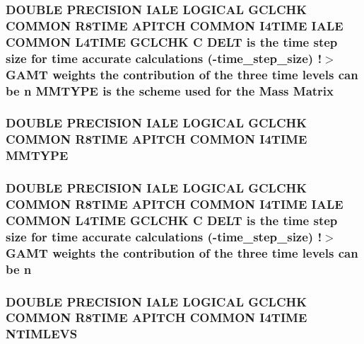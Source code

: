\hypertarget{time_8com_a04b69bf706ac5ad697f30180a0614468}{
\subsubsection[{Matrix}]{\setlength{\rightskip}{0pt plus 5cm}D\-O\-U\-B\-L\-E P\-R\-E\-C\-I\-S\-I\-O\-N I\-A\-L\-E L\-O\-G\-I\-C\-A\-L G\-C\-L\-C\-H\-K C\-O\-M\-M\-O\-N R8\-T\-I\-M\-E {\bf A\-P\-I\-T\-C\-H} C\-O\-M\-M\-O\-N I4\-T\-I\-M\-E I\-A\-L\-E C\-O\-M\-M\-O\-N L4\-T\-I\-M\-E G\-C\-L\-C\-H\-K C {\bf D\-E\-L\-T} is the time {\bf step} size for time accurate calculations (-\/time\-\_\-step\-\_\-size) !$>$ {\bf G\-A\-M\-T} weights the contribution of the three time levels can be {\bf n} {\bf M\-M\-T\-Y\-P\-E} is the scheme {\bf used} for the Mass Matrix}}\label{time_8com_a04b69bf706ac5ad697f30180a0614468}
\hypertarget{time_8com_a7cab4e82cd8529facf6a2802f81887ff}{
\subsubsection[{M\-M\-T\-Y\-P\-E}]{\setlength{\rightskip}{0pt plus 5cm}D\-O\-U\-B\-L\-E P\-R\-E\-C\-I\-S\-I\-O\-N I\-A\-L\-E L\-O\-G\-I\-C\-A\-L G\-C\-L\-C\-H\-K C\-O\-M\-M\-O\-N R8\-T\-I\-M\-E {\bf A\-P\-I\-T\-C\-H} C\-O\-M\-M\-O\-N I4\-T\-I\-M\-E M\-M\-T\-Y\-P\-E}}\label{time_8com_a7cab4e82cd8529facf6a2802f81887ff}
\hypertarget{time_8com_a59787df2891338b611ba3a1096154aa3}{
\subsubsection[{n}]{\setlength{\rightskip}{0pt plus 5cm}D\-O\-U\-B\-L\-E P\-R\-E\-C\-I\-S\-I\-O\-N I\-A\-L\-E L\-O\-G\-I\-C\-A\-L G\-C\-L\-C\-H\-K C\-O\-M\-M\-O\-N R8\-T\-I\-M\-E {\bf A\-P\-I\-T\-C\-H} C\-O\-M\-M\-O\-N I4\-T\-I\-M\-E I\-A\-L\-E C\-O\-M\-M\-O\-N L4\-T\-I\-M\-E G\-C\-L\-C\-H\-K C {\bf D\-E\-L\-T} is the time {\bf step} size for time accurate calculations (-\/time\-\_\-step\-\_\-size) !$>$ {\bf G\-A\-M\-T} weights the contribution of the three time levels can be n}}\label{time_8com_a59787df2891338b611ba3a1096154aa3}
\hypertarget{time_8com_a6fd76fb7d397612fe162f096d76afc1f}{
\subsubsection[{N\-T\-I\-M\-L\-E\-V\-S}]{\setlength{\rightskip}{0pt plus 5cm}D\-O\-U\-B\-L\-E P\-R\-E\-C\-I\-S\-I\-O\-N I\-A\-L\-E L\-O\-G\-I\-C\-A\-L G\-C\-L\-C\-H\-K C\-O\-M\-M\-O\-N R8\-T\-I\-M\-E {\bf A\-P\-I\-T\-C\-H} C\-O\-M\-M\-O\-N I4\-T\-I\-M\-E N\-T\-I\-M\-L\-E\-V\-S}}\label{time_8com_a6fd76fb7d397612fe162f096d76afc1f}
